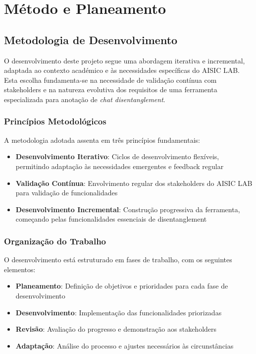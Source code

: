 \chapter{Método e Planeamento}

\section{Metodologia de Desenvolvimento}

O desenvolvimento deste projeto segue uma abordagem iterativa e incremental, adaptada ao contexto académico e às necessidades específicas do AISIC LAB. Esta escolha fundamenta-se na necessidade de validação contínua com stakeholders e na natureza evolutiva dos requisitos de uma ferramenta especializada para anotação de \textit{chat disentanglement}.

\subsection{Princípios Metodológicos}

A metodologia adotada assenta em três princípios fundamentais:

\begin{itemize}
    \item \textbf{Desenvolvimento Iterativo}: Ciclos de desenvolvimento flexíveis, permitindo adaptação às necessidades emergentes e feedback regular
    \item \textbf{Validação Contínua}: Envolvimento regular dos stakeholders do AISIC LAB para validação de funcionalidades
    \item \textbf{Desenvolvimento Incremental}: Construção progressiva da ferramenta, começando pelas funcionalidades essenciais de disentanglement
\end{itemize}

\subsection{Organização do Trabalho}

O desenvolvimento está estruturado em fases de trabalho, com os seguintes elementos:

\begin{itemize}
    \item \textbf{Planeamento}: Definição de objetivos e prioridades para cada fase de desenvolvimento
    \item \textbf{Desenvolvimento}: Implementação das funcionalidades priorizadas
    \item \textbf{Revisão}: Avaliação do progresso e demonstração aos stakeholders
    \item \textbf{Adaptação}: Análise do processo e ajustes necessários às circunstâncias
\end{itemize}

